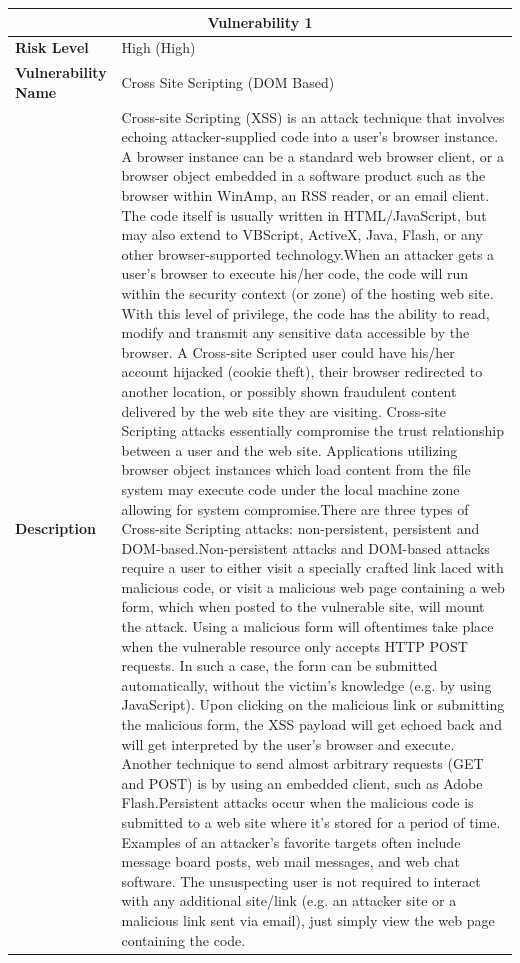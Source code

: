 \documentclass[12pt]{article}
\begin{document}
\begin{center}
\renewcommand{\arraystretch}{1.3}
\begin{longtable}{|l|p{10cm}|}
\hline
\multicolumn{2}{|c|}{\textbf{Vulnerability 1}} \\
\hline
\textbf{Risk Level} & High (High) \\
\hline
\textbf{Vulnerability Name} & Cross Site Scripting (DOM Based) \\
\hline
\textbf{Description} & Cross-site Scripting (XSS) is an attack technique that involves echoing attacker-supplied code into a user's browser instance. A browser instance can be a standard web browser client, or a browser object embedded in a software product such as the browser within WinAmp, an RSS reader, or an email client. The code itself is usually written in HTML/JavaScript, but may also extend to VBScript, ActiveX, Java, Flash, or any other browser-supported technology.When an attacker gets a user's browser to execute his/her code, the code will run within the security context (or zone) of the hosting web site. With this level of privilege, the code has the ability to read, modify and transmit any sensitive data accessible by the browser. A Cross-site Scripted user could have his/her account hijacked (cookie theft), their browser redirected to another location, or possibly shown fraudulent content delivered by the web site they are visiting. Cross-site Scripting attacks essentially compromise the trust relationship between a user and the web site. Applications utilizing browser object instances which load content from the file system may execute code under the local machine zone allowing for system compromise.There are three types of Cross-site Scripting attacks: non-persistent, persistent and DOM-based.Non-persistent attacks and DOM-based attacks require a user to either visit a specially crafted link laced with malicious code, or visit a malicious web page containing a web form, which when posted to the vulnerable site, will mount the attack. Using a malicious form will oftentimes take place when the vulnerable resource only accepts HTTP POST requests. In such a case, the form can be submitted automatically, without the victim's knowledge (e.g. by using JavaScript). Upon clicking on the malicious link or submitting the malicious form, the XSS payload will get echoed back and will get interpreted by the user's browser and execute. Another technique to send almost arbitrary requests (GET and POST) is by using an embedded client, such as Adobe Flash.Persistent attacks occur when the malicious code is submitted to a web site where it's stored for a period of time. Examples of an attacker's favorite targets often include message board posts, web mail messages, and web chat software. The unsuspecting user is not required to interact with any additional site/link (e.g. an attacker site or a malicious link sent via email), just simply view the web page containing the code. \\

\end{longtable}
\end{center}
\end{document}
